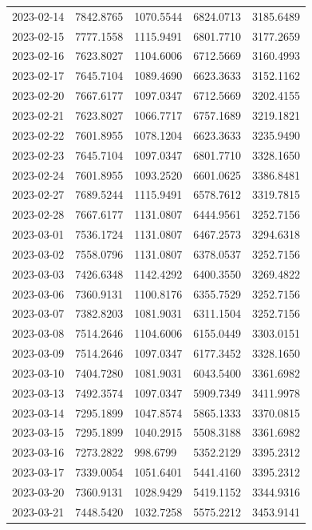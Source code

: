 {\begin{longtable}{lllll}
2023-02-14 & 7842.8765 & 1070.5544 & 6824.0713 & 3185.6489 \\
2023-02-15 & 7777.1558 & 1115.9491 & 6801.7710 & 3177.2659 \\
2023-02-16 & 7623.8027 & 1104.6006 & 6712.5669 & 3160.4993 \\
2023-02-17 & 7645.7104 & 1089.4690 & 6623.3633 & 3152.1162 \\
2023-02-20 & 7667.6177 & 1097.0347 & 6712.5669 & 3202.4155 \\
2023-02-21 & 7623.8027 & 1066.7717 & 6757.1689 & 3219.1821 \\
2023-02-22 & 7601.8955 & 1078.1204 & 6623.3633 & 3235.9490 \\
2023-02-23 & 7645.7104 & 1097.0347 & 6801.7710 & 3328.1650 \\
2023-02-24 & 7601.8955 & 1093.2520 & 6601.0625 & 3386.8481 \\
2023-02-27 & 7689.5244 & 1115.9491 & 6578.7612 & 3319.7815 \\
2023-02-28 & 7667.6177 & 1131.0807 & 6444.9561 & 3252.7156 \\
2023-03-01 & 7536.1724 & 1131.0807 & 6467.2573 & 3294.6318 \\
2023-03-02 & 7558.0796 & 1131.0807 & 6378.0537 & 3252.7156 \\
2023-03-03 & 7426.6348 & 1142.4292 & 6400.3550 & 3269.4822 \\
2023-03-06 & 7360.9131 & 1100.8176 & 6355.7529 & 3252.7156 \\
2023-03-07 & 7382.8203 & 1081.9031 & 6311.1504 & 3252.7156 \\
2023-03-08 & 7514.2646 & 1104.6006 & 6155.0449 & 3303.0151 \\
2023-03-09 & 7514.2646 & 1097.0347 & 6177.3452 & 3328.1650 \\
2023-03-10 & 7404.7280 & 1081.9031 & 6043.5400 & 3361.6982 \\
2023-03-13 & 7492.3574 & 1097.0347 & 5909.7349 & 3411.9978 \\
2023-03-14 & 7295.1899 & 1047.8574 & 5865.1333 & 3370.0815 \\
2023-03-15 & 7295.1899 & 1040.2915 & 5508.3188 & 3361.6982 \\
2023-03-16 & 7273.2822 & 998.6799 & 5352.2129 & 3395.2312 \\
2023-03-17 & 7339.0054 & 1051.6401 & 5441.4160 & 3395.2312 \\
2023-03-20 & 7360.9131 & 1028.9429 & 5419.1152 & 3344.9316 \\
2023-03-21 & 7448.5420 & 1032.7258 & 5575.2212 & 3453.9141 \\

\end{longtable}}
